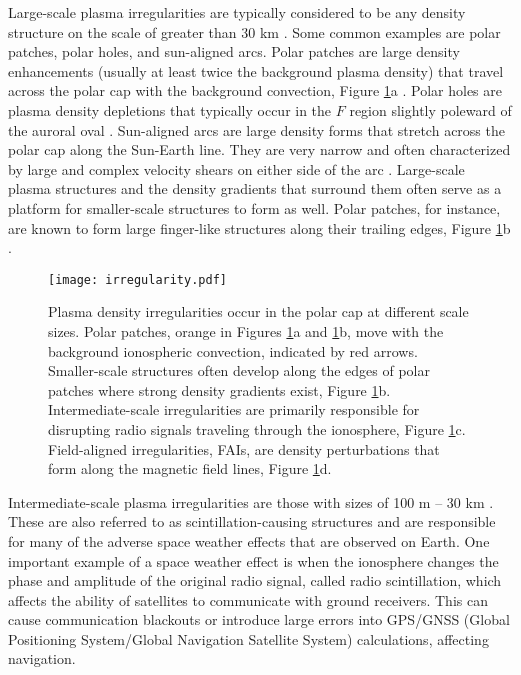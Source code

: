 Large-scale plasma irregularities are typically considered to be any density structure on the scale of greater than 30 km \citep{Kelley2009}.  Some common examples are polar patches, polar holes, and sun-aligned arcs.  Polar patches are large density enhancements (usually at least twice the background plasma density) that travel across the polar cap with the background convection, Figure \ref{fig:polarirreg}a \citep{Weber1984,Valladares1994}.  Polar holes are plasma density depletions that typically occur in the \(F\) region slightly poleward of the auroral oval \citep{Brinton1978}.  Sun-aligned arcs are large density forms that stretch across the polar cap along the Sun-Earth line.  They are very narrow and often characterized by large and complex velocity shears on either side of the arc \citep{Valladares1991}.  Large-scale plasma structures and the density gradients that surround them often serve as a platform for smaller-scale structures to form as well.  Polar patches, for instance, are known to form large finger-like structures along their trailing edges, Figure \ref{fig:polarirreg}b \citep{Gondarenko2004b,Hosokawa2016}.

\begin{figure}
	\centering
	\texttt{[image: irregularity.pdf]}
	\caption[Plasma irregularities in the polar ionosphere]{Plasma density irregularities occur in the polar cap at different scale sizes.  Polar patches, orange in Figures \ref{fig:polarirreg}a and \ref{fig:polarirreg}b, move with the background ionospheric convection, indicated by red arrows.  Smaller-scale structures often develop along the edges of polar patches where strong density gradients exist, Figure \ref{fig:polarirreg}b.  Intermediate-scale irregularities are primarily responsible for disrupting radio signals traveling through the ionosphere, Figure \ref{fig:polarirreg}c.  Field-aligned irregularities, FAIs, are density perturbations that form along the magnetic field lines, Figure \ref{fig:polarirreg}d.}
	\label{fig:polarirreg}
\end{figure}

Intermediate-scale plasma irregularities are those with sizes of 100 m -- 30 km \citep{Kelley2009}.  These are also referred to as scintillation-causing structures and are responsible for many of the adverse space weather effects that are observed on Earth.  One important example of a space weather effect is when the ionosphere changes the phase and amplitude of the original radio signal, called radio scintillation, which affects the ability of satellites to communicate with ground receivers.  This can cause communication blackouts or introduce large errors into GPS/GNSS (Global Positioning System/Global Navigation Satellite System) calculations, affecting navigation.

